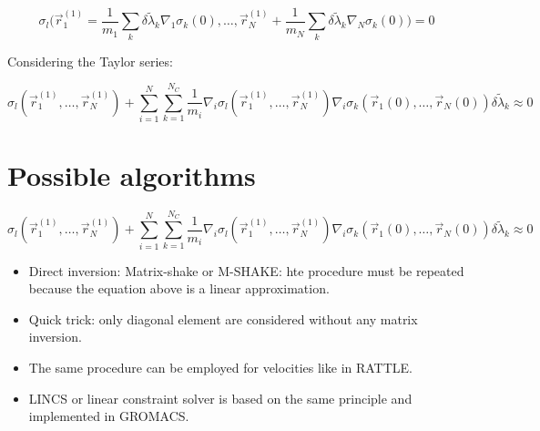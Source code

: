 	$$\sigma_l\biggl(\vec{r}_1^{(1)} = \frac{1}{m_1}\sum\limits_k\delta\tilde{\lambda}_k\nabla_1\sigma_k(0), \dots, \vec{r}_N^{(1)} + \frac{1}{m_N}\sum\limits_{k}\delta\tilde{\lambda}_k\nabla_N\sigma_k(0)\biggr) = 0$$

	Considering the Taylor series:

	$$\sigma_l(\vec{r}_1^{(1)}, \dots, \vec{r}_N^{(1)}) + \sum\limits_{i=1}^N\sum\limits_{k=1}^{N_C}\frac{1}{m_i}\nabla_i\sigma_l(\vec{r}_1^{(1)}, \dots, \vec{r}_N^{(1)})\nabla_i\sigma_k(\vec{r}_1(0), \dots, \vec{r}_N(0))\delta\tilde{\lambda}_k\approx 0$$

\section{Possible algorithms}

$$\sigma_l(\vec{r}_1^{(1)}, \dots, \vec{r}_N^{(1)}) + \sum\limits_{i=1}^N\sum\limits_{k=1}^{N_C}\frac{1}{m_i}\nabla_i\sigma_l(\vec{r}_1^{(1)}, \dots, \vec{r}_N^{(1)})\nabla_i\sigma_k(\vec{r}_1(0), \dots, \vec{r}_N(0))\delta\tilde{\lambda}_k\approx 0$$

\begin{itemize}
	\item Direct inversion: Matrix-shake or M-SHAKE: hte procedure must be repeated because the equation above is a linear approximation.
	\item Quick trick: only diagonal element are considered without any matrix inversion.
	\item The same procedure can be employed for velocities like in RATTLE.
	\item LINCS or linear constraint solver is based on the same principle and implemented in GROMACS.
\end{itemize}
